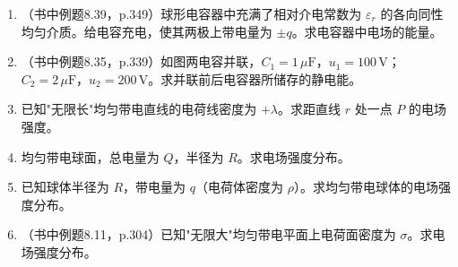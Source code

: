 \documentclass{ctexart}
\begin{document}
\begin{enumerate}
\item（书中例题8.39，p.349）球形电容器中充满了相对介电常数为 $\varepsilon_r$ 的各向同性均匀介质。给电容充电，使其两极上带电量为 $\pm q$。求电容器中电场的能量。

\item（书中例题8.35，p.339）如图两电容并联，$C_1 = 1\,\mu\text{F}$，$u_1 = 100\,\text{V}$；$C_2 = 2\,\mu\text{F}$，$u_2 = 200\,\text{V}$。求并联前后电容器所储存的静电能。

\item 已知"无限长"均匀带电直线的电荷线密度为 $+\lambda$。求距直线 $r$ 处一点 $P$ 的电场强度。

\item 均匀带电球面，总电量为 $Q$，半径为 $R$。求电场强度分布。

\item 已知球体半径为 $R$，带电量为 $q$（电荷体密度为 $\rho$）。求均匀带电球体的电场强度分布。

\item（书中例题8.11，p.304）已知"无限大"均匀带电平面上电荷面密度为 $\sigma$。求电场强度分布。

\end{enumerate}
\end{document}
